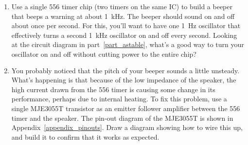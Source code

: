 \begin{enumerate}[wide]
\item Use a single 556 timer chip (two timers on the same IC) to build a beeper that beeps a warning at about 1~kHz.  The beeper should sound on and off about once per second.  For this, you'll want to have one 1~Hz oscillator that effectively turns a second 1~kHz oscillator on and off every second.  Looking at the circuit diagram in part~\ref{part_astable}, what's a good way to turn your oscillator on and off without cutting power to the entire chip?

\item You probably noticed that the pitch of your beeper sounds a little unsteady.  What's happening is that because of the low impedance of the speaker, the high current drawn from the 556 timer is causing some change in its performance, perhaps due to internal heating.  To fix this problem, use a single MJE3055T transistor as an emitter follower amplifier between the 556 timer and the speaker.  The pin-out diagram of the MJE3055T is shown in Appendix~\ref{appendix_pinouts}.  Draw a diagram showing how to wire this up, and build it to confirm that it works as expected.
\end{enumerate}







